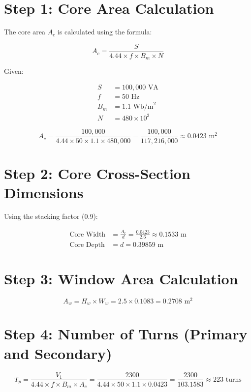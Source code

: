 \documentclass[12pt]{article}
\begin{document}
\section*{Step 1: Core Area Calculation}
The core area $A_c$ is calculated using the formula:

\begin{equation}
	A_c = \frac{S}{4.44 \times f \times B_m \times N}
\end{equation}

Given:

\begin{align*}
	S &= 100,000 \text{ VA} \\
	f &= 50 \text{ Hz} \\
	B_m &= 1.1 \text{ Wb/m}^2 \\
	N &= 480 \times 10^3
\end{align*}

\begin{equation}
	A_c = \frac{100,000}{4.44 \times 50 \times 1.1 \times 480,000} = \frac{100,000}{117,216,000} \approx 0.0423 \text{ m}^2
\end{equation}

\section*{Step 2: Core Cross-Section Dimensions}
Using the stacking factor (0.9):

\begin{align*}
	\text{Core Width} &= \frac{A_c}{d} = \frac{0.0423}{2.6} \approx 0.1533 \text{ m} \\
	\text{Core Depth} &= d = 0.39859 \text{ m}
\end{align*}

\section*{Step 3: Window Area Calculation}

\begin{equation}
	A_w = H_w \times W_w = 2.5 \times 0.1083 = 0.2708 \text{ m}^2
\end{equation}

\section*{Step 4: Number of Turns (Primary and Secondary)}

\begin{equation}
	T_p = \frac{V_1}{4.44 \times f \times B_m \times A_c} = \frac{2300}{4.44 \times 50 \times 1.1 \times 0.0423} = \frac{2300}{103.1583} \approx 223 \text{ turns}
\end{equation}
\end{document}
